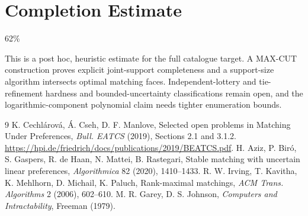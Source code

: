 \documentclass[11pt]{article}
\theoremstyle{definition}
\begin{document}
\section{Completion Estimate}
62\%

This is a post hoc, heuristic estimate for the full catalogue target.
A MAX-CUT construction proves explicit joint-support completeness and a support-size algorithm intersects optimal matching faces. Independent-lottery and tie-refinement hardness and bounded-uncertainty classifications remain open, and the logarithmic-component polynomial claim needs tighter enumeration bounds.

\begin{thebibliography}{9}
 K. Cechl\'arov\'a, \'A. Cseh, D. F. Manlove, Selected open problems in Matching Under Preferences,
\emph{Bull. EATCS} (2019), Sections 2.1 and 3.1.2. \url{https://hpi.de/friedrich/docs/publications/2019/BEATCS.pdf}.
 H. Aziz, P. Bir\'o, S. Gaspers, R. de Haan, N. Mattei, B. Rastegari, Stable matching with uncertain
linear preferences, \emph{Algorithmica} 82 (2020), 1410--1433.
 R. W. Irving, T. Kavitha, K. Mehlhorn, D. Michail, K. Paluch, Rank-maximal matchings,
\emph{ACM Trans. Algorithms} 2 (2006), 602--610.
 M. R. Garey, D. S. Johnson, \emph{Computers and Intractability}, Freeman (1979).
\end{thebibliography}
\end{document}
